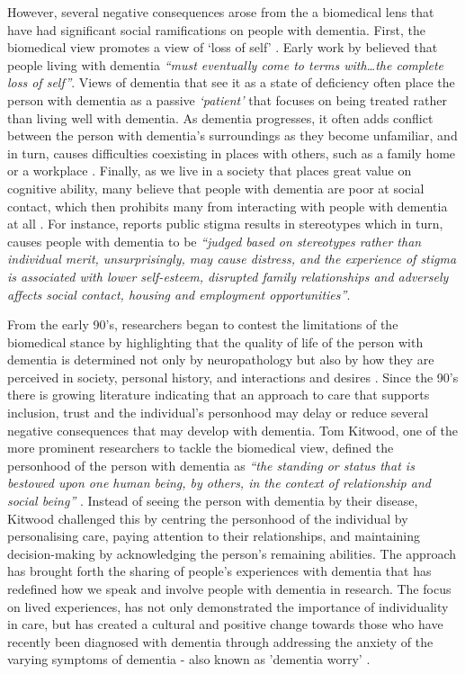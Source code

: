 However, several negative consequences arose from the a biomedical lens that have had significant social ramifications on people with dementia. First, the biomedical view promotes a view of `loss of self' \citep{ryan_dementia_2009}. Early work by \cite{cohen_loss_1986} believed that people living with dementia \textit{``must eventually come to terms with…the complete loss of self''}. Views of dementia that see it as a state of deficiency often place the person with dementia as a passive \textit{`patient'} that focuses on being treated rather than living well with dementia. As dementia progresses, it often adds conflict between the person with dementia's surroundings as they become unfamiliar, and in turn, causes difficulties coexisting in places with others, such as a family home or a workplace \citep{langdon_making_2007}. Finally, as we live in a society that places great value on cognitive ability, many believe that people with dementia are poor at social contact, which then prohibits many from interacting with people with dementia at all \citep{killick_communication_2001}. For instance, \cite{mukadam2012reducing} reports public stigma results in stereotypes which in turn, causes people with dementia to be \textit{``judged based on stereotypes rather than individual merit, unsurprisingly, may cause distress, and the experience of stigma is associated with
lower self-esteem, disrupted family relationships
and adversely affects social contact, housing and
employment opportunities''}.

From the early 90's, researchers began to contest the limitations of the biomedical stance by highlighting that the quality of life of the person with dementia is determined not only by neuropathology but also by how they are perceived in society, personal history, and interactions and desires \citep{o2007personhood}. Since the 90's there is growing literature indicating that an approach to care that supports inclusion, trust and the individual's personhood may delay or reduce several negative consequences that may develop with dementia. Tom Kitwood, one of the more prominent researchers to tackle the biomedical view, defined the personhood of the person with dementia as \textit{``the standing or status that is bestowed upon one human being, by others, in the context of relationship and social being''} \citep[p.8]{kitwood1997dementia}. Instead of seeing the person with dementia by their disease, Kitwood challenged this by centring the personhood of the individual by personalising care, paying attention to their relationships, and maintaining decision-making by acknowledging the person's remaining abilities. The approach has brought forth the sharing of people's experiences with dementia that has redefined how we speak and involve people with dementia in research. The focus on lived experiences, has not only demonstrated the importance of individuality in care, but has created a cultural and positive change towards those who have recently been diagnosed with dementia through addressing the anxiety of the varying symptoms of dementia - also known as 'dementia worry' \citep{kessler_dementia_2012}.

